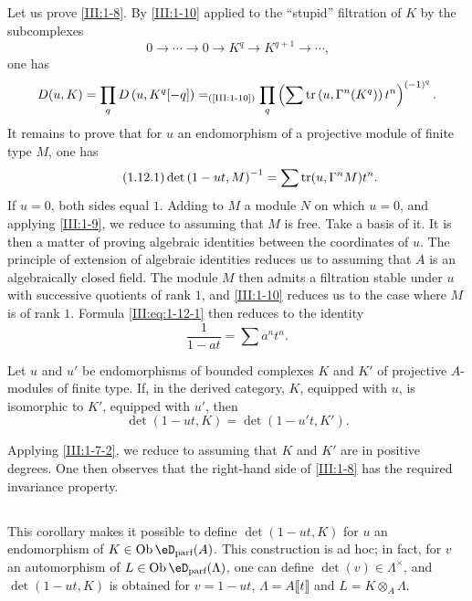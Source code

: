 \subsection{}\label{III:1-12}

Let us prove \ref{III:1-8}. By \ref{III:1-10} applied to the
``stupid'' filtration of $K$ by the subcomplexes
\[
  0 \to \cdots \to 0 \to K^q \to K^{q+1} \to \cdots \text{,}
\]
one has
\[
  D(u,K) = \prod_q D\left(u,K^q[-q]\right) =_{\text{(\ref{III:1-10})}} \prod_q \left(\sum \operatorname{tr}\left(u,\Gamma^n(K^q)\right) t^n \right)^{(-1)^q} \text{.}
\]
It remains to prove that for $u$ an endomorphism of a projective module of finite
type $M$, one has
\begin{equation*}\tag{1.12.1}\label{III:eq:1-12-1}
  \det\left(1-u t,M\right)^{-1} = \sum \operatorname{tr}(u,\Gamma^n M) t^n \text{.}
\end{equation*}
If $u=0$, both sides equal $1$. Adding to $M$ a module $N$ on which
$u=0$, and applying \ref{III:1-9}, we reduce to assuming that $M$ is free.
Take a basis of it. It is then a matter of proving algebraic identities
between the coordinates of $u$. The principle of extension of algebraic
identities reduces us to assuming that $A$ is an algebraically closed
field. The module $M$ then admits a filtration stable under $u$ with successive
quotients of rank $1$, and \ref{III:1-10} reduces us to the case where $M$ is of
rank $1$. Formula \eqref{III:eq:1-12-1} then reduces to the identity
\[
  \frac{1}{1-a t} = \sum a^n t^n \text{.}
\]




\begin{corollary_}\label{III:1-13}
Let $u$ and $u'$ be endomorphisms of bounded complexes $K$ and $K'$ of
projective $A$-modules of finite type. If, in the derived category, $K$,
equipped with $u$, is isomorphic to $K'$, equipped with $u'$, then
\[
  \det(1-u t,K) = \det(1-u' t,K') \text{.}
\]
\end{corollary_}

Applying \ref{III:1-7-2}, we reduce to assuming that $K$ and $K'$ are in
positive degrees. One then observes that the right-hand side of \ref{III:1-8}
has the required invariance property.




\subsection{}\label{III:1-14}

This corollary makes it possible to define $\det(1-u t,K)$ for $u$ an endomorphism of
$K\in \ob\eD_\text{parf}(A)$. This construction is ad hoc; in fact, for $v$ an
automorphism of $L\in\ob\eD_\text{parf}(\Lambda)$, one can define
$\det(v)\in\Lambda^\times$, and $\det(1-u t,K)$ is obtained for $v=1-u t$,
$\Lambda=A\llbracket t\rrbracket$ and $L=K\otimes_A\Lambda$.










